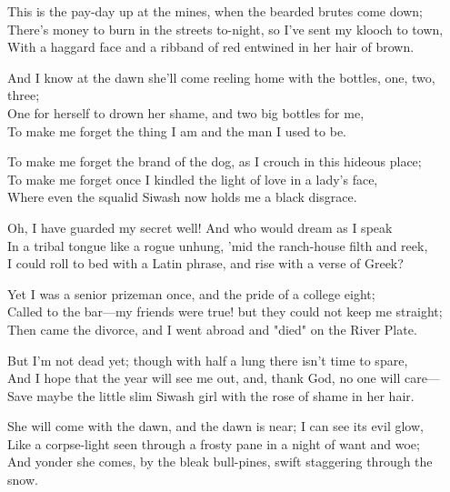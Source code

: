
\begin{poemblock}
This is the pay-day up at the mines, when the bearded brutes come down;\\
There's money to burn in the streets to-night, so I've sent my klooch to town,\\
With a haggard face and a ribband of red entwined in her hair of brown.

And I know at the dawn she'll come reeling home with the bottles, one, two, three;\\
One for herself to drown her shame, and two big bottles for me,\\
To make me forget the thing I am and the man I used to be.

To make me forget the brand of the dog, as I crouch in this hideous place;\\
To make me forget once I kindled the light of love in a lady's face,\\
Where even the squalid Siwash now holds me a black disgrace.

Oh, I have guarded my secret well! And who would dream as I speak\\
In a tribal tongue like a rogue unhung, 'mid the ranch-house filth and reek,\\
I could roll to bed with a Latin phrase, and rise with a verse of Greek?

Yet I was a senior prizeman once, and the pride of a college eight;\\
Called to the bar—my friends were true! but they could not keep me straight;\\
Then came the divorce, and I went abroad and "died" on the River Plate.

But I'm not dead yet; though with half a lung there isn't time to spare,\\
And I hope that the year will see me out, and, thank God, no one will care—\\
Save maybe the little slim Siwash girl with the rose of shame in her hair.

She will come with the dawn, and the dawn is near; I can see its evil glow,\\
Like a corpse-light seen through a frosty pane in a night of want and woe;\\
And yonder she comes, by the bleak bull-pines, swift staggering through the snow.

\end{poemblock}
